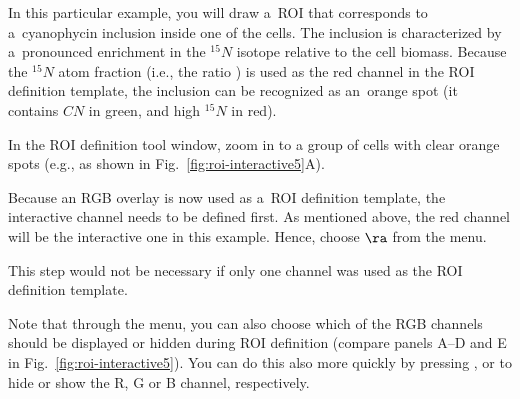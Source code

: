 In this particular example, you will draw a~ROI that corresponds to a~cyanophycin inclusion inside one of the cells. The inclusion is characterized by a~pronounced enrichment in the ${}^{15}N$ isotope relative to the cell biomass. Because the ${}^{15}N$ atom fraction (i.e., the ratio ) is used as the red channel in the ROI definition template, the inclusion can be recognized as an~orange spot (it contains $CN$ in green, and high ${}^{15}N$ in red).

\s In the ROI definition tool window, zoom in to a group of cells with clear orange spots (e.g., as shown in Fig.~\ref{fig:roi-interactive5}A).

\s Because an RGB overlay is now used as a~ROI definition template, the interactive channel needs to be defined first. As mentioned above, the red channel will be the interactive one in this example. Hence, choose  $\ra$  from the menu. 

\bul This step would not be necessary if only one channel was used as the ROI definition template. 

\bul Note that through the  menu, you can also choose which of the RGB channels should be displayed or hidden during ROI definition (compare panels A--D and E in Fig.~\ref{fig:roi-interactive5}). You can do this also more quickly by pressing ,  or  to hide or show the R, G or B channel, respectively.

